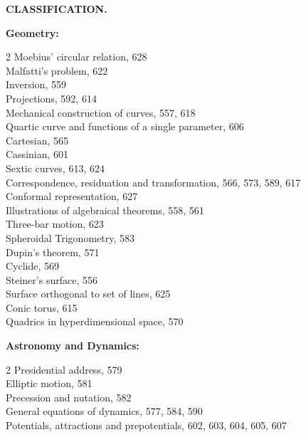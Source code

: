\documentclass[12pt,a4paper]{article}
\theoremstyle{plain}
\theoremstyle{definition}
\begin{document}

\newpage
\setcounter{page}{15}

\begin{center}
{\large \textbf{CLASSIFICATION.}}
\end{center}

\vspace{12pt}

\noindent \textbf{Geometry:}

\begin{multicols}{2}
Moebius' circular relation, 628\\
Malfatti's problem, 622\\
Inversion, 559\\
Projections, 592, 614\\
Mechanical construction of curves, 557, 618\\
Quartic curve and functions of a single parameter, 606\\
Cartesian, 565\\
Cassinian, 601\\
Sextic curves, 613, 624\\
Correspondence, residuation and transformation, 566, 573, 589, 617\\
Conformal representation, 627\\
Illustrations of algebraical theorems, 558, 561\\
Three-bar motion, 623\\
Spheroidal Trigonometry, 583\\
Dupin's theorem, 571\\
Cyclide, 569\\
Steiner's surface, 556\\
Surface orthogonal to set of lines, 625\\
Conic torus, 615\\
Quadrics in hyperdimensional space, 570\\
\end{multicols}

\vspace{12pt}

\noindent \textbf{Astronomy and Dynamics:}

\begin{multicols}{2}
Presidential address, 579\\
Elliptic motion, 581\\
Precession and nutation, 582\\
General equations of dynamics, 577, 584, 590\\
Potentials, attractions and prepotentials, 602, 603, 604, 605, 607\\
\end{multicols}
\end{document}
